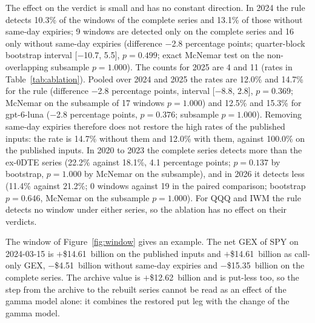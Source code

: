 The effect on the verdict is small and has no constant direction. In 2024 the rule detects 10.3\% of the windows of the complete series and 13.1\% of those without same-day expiries; 9 windows are detected only on the complete series and 16 only without same-day expiries (difference $-$2.8 percentage points; quarter-block bootstrap interval [$-$10.7, 5.5], $p=0.499$; exact McNemar test on the non-overlapping subsample $p=1.000$). The counts for 2025 are 4 and 11 (rates in Table~\ref{tab:ablation}). Pooled over 2024 and 2025 the rates are 12.0\% and 14.7\% for the rule (difference $-$2.8 percentage points, interval [$-$8.8, 2.8], $p=0.369$; McNemar on the subsample of 17 windows $p=1.000$) and 12.5\% and 15.3\% for gpt-6-luna ($-$2.8 percentage points, $p=0.376$; subsample $p=1.000$). Removing same-day expiries therefore does not restore the high rates of the published inputs: the rate is 14.7\% without them and 12.0\% with them, against 100.0\% on the published inputs. In 2020 to 2023 the complete series detects more than the ex-0DTE series (22.2\% against 18.1\%, 4.1 percentage points; $p=0.137$ by bootstrap, $p=1.000$ by McNemar on the subsample), and in 2026 it detects less (11.4\% against 21.2\%; 0 windows against 19 in the paired comparison; bootstrap $p=0.646$, McNemar on the subsample $p=1.000$). For QQQ and IWM the rule detects no window under either series, so the ablation has no effect on their verdicts.

The window of Figure~\ref{fig:window} gives an example. The net GEX of SPY on 2024-03-15 is $+$\$14.61~billion on the published inputs and $+$\$14.61~billion as call-only GEX, $-$\$4.51~billion without same-day expiries and $-$\$15.35~billion on the complete series. The archive value is $+$\$12.62~billion and is put-less too, so the step from the archive to the rebuilt series cannot be read as an effect of the gamma model alone: it combines the restored put leg with the change of the gamma model.

